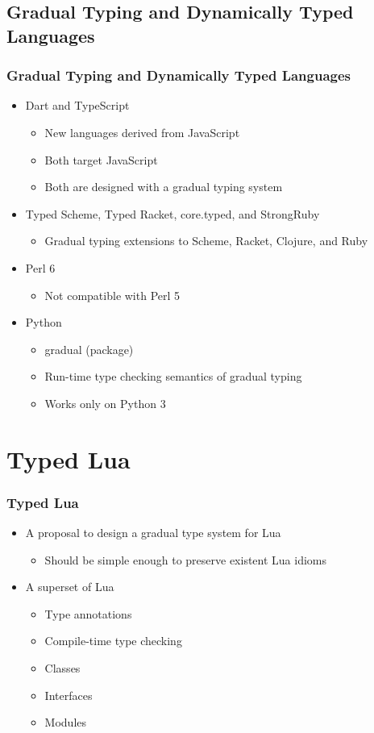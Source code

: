 \documentclass{beamer}
\begin{document}
\subsection{Gradual Typing and Dynamically Typed Languages}
\begin{frame}
\frametitle{Gradual Typing and Dynamically Typed Languages}
\begin{itemize}
\item Dart and TypeScript
\begin{itemize}
\item New languages derived from JavaScript
\item Both target JavaScript
\item Both are designed with a gradual typing system
\end{itemize}
\item Typed Scheme, Typed Racket, core.typed, and StrongRuby
\begin{itemize}
\item Gradual typing extensions to Scheme, Racket, Clojure, and Ruby
\end{itemize}
\item Perl 6
\begin{itemize}
\item Not compatible with Perl 5
\end{itemize}
\item Python
\begin{itemize}
\item gradual (package)
\item Run-time type checking semantics of gradual typing
\item Works only on Python 3
\end{itemize}
\end{itemize}
\end{frame}

\section{Typed Lua}
\begin{frame}
\frametitle{Typed Lua}
\begin{itemize}
\item A proposal to design a gradual type system for Lua
\begin{itemize}
\item Should be simple enough to preserve existent Lua idioms
\end{itemize}
\item A superset of Lua
\begin{itemize}
\item Type annotations
\item Compile-time type checking
\item Classes
\item Interfaces
\item Modules
\end{itemize}
\end{itemize}
\end{frame}
\end{document}
